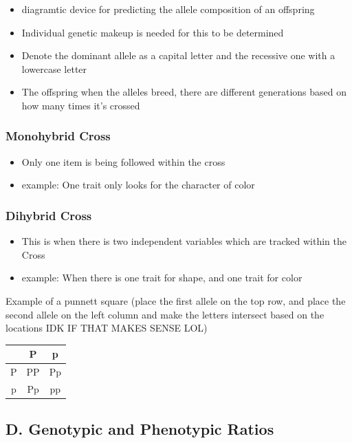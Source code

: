 \documentclass{article}
\begin{document}
\begin{itemize}
    \item diagramtic device for predicting the allele composition of an offspring
    \item Individual genetic makeup is needed for this to be determined
    \item Denote the dominant allele as a capital letter and the recessive one with a lowercase letter
    \item The offspring when the alleles breed, there are different generations based on how many times it's crossed
\end{itemize}

\subsubsection*{Monohybrid Cross}
\begin{itemize}
    \item Only one item is being followed within the cross
    \item example: One trait only looks for the character of color
\end{itemize}

\subsubsection*{Dihybrid Cross}
\begin{itemize}
    \item This is when there is two independent variables which are tracked within the Cross
    \item example: When there is one trait for shape, and one trait for color
\end{itemize}
Example of a punnett square (place the first allele on the top row, and place the second allele on the left column and make the letters intersect based on the locations IDK IF THAT MAKES SENSE LOL)
\begin{center}
    \begin{tabular}{ c | c | c }
      & P & p \\ 
      \hline
     P & PP & Pp \\
     \hline  
     p & Pp & pp    
    \end{tabular}
\end{center}

\subsection*{D. Genotypic and Phenotypic Ratios}
\end{document}

